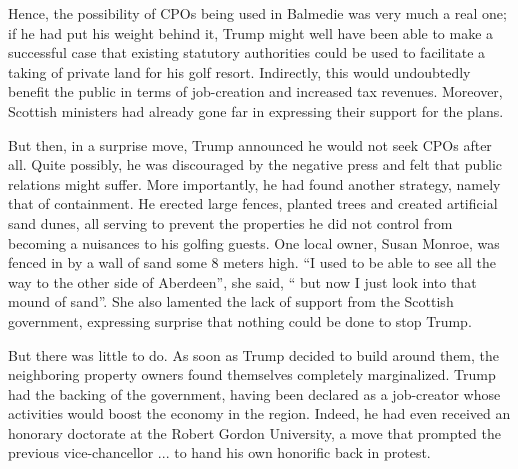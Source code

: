 Hence, the possibility of CPOs being used in Balmedie was very much a real one; if he had put his weight behind it, Trump might well have been able to make a successful case that existing statutory authorities could be used to facilitate a taking of private land for his golf resort. Indirectly, this would undoubtedly benefit the public in terms of job-creation and increased tax revenues. Moreover, Scottish ministers had already gone far in expressing their support for the plans.

But then, in a surprise move, Trump announced he would not seek CPOs after all. Quite possibly, he was discouraged by the negative press and felt that public relations might suffer. More importantly, he had found another strategy, namely that of containment.
He erected large fences, planted trees and created artificial sand dunes, all serving to prevent the properties he did not control from becoming a nuisances to his golfing guests. One local owner, Susan Monroe, was fenced in by a wall of sand some 8 meters high. ``I used to be able to see all the way to the other side of Aberdeen'', she said, `` but now I just look into that mound of sand''. She also lamented the lack of support from the Scottish government, expressing surprise that nothing could be done to stop Trump.

But there was little to do. As soon as Trump decided to build around them, the neighboring property owners found themselves completely marginalized. Trump had the backing of the government, having been declared as a job-creator whose activities would boost the economy in the region. Indeed, he had even received an honorary doctorate at the Robert Gordon University, a move that prompted the previous vice-chancellor ... to hand his own honorific back in protest.

